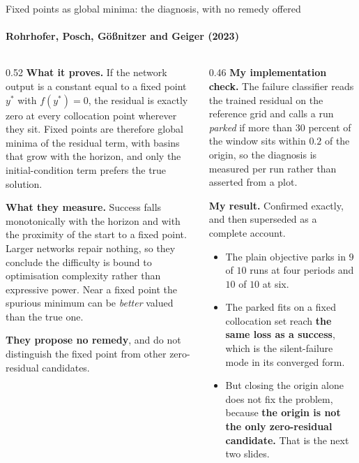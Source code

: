 \documentclass[aspectratio=169,10pt]{beamer}
\newcommand{\hl}[1]{{\color{accent}\textbf{#1}}}
\newcommand{\bad}[1]{{\color{warm}\textbf{#1}}}
\begin{document}
\begin{frame}[shrink=25]{Fixed points as global minima: the diagnosis, with no remedy offered}
  \framesubtitle{Rohrhofer, Posch, G\"o\ss{}nitzer and Geiger (2023)}
  \vspace{1mm}
  \begin{columns}[T]
    \begin{column}{0.52\textwidth}
      \textbf{What it proves.} If the network output is a constant equal to a
      fixed point $y^{\ast}$ with $f(y^{\ast}) = 0$, the residual is exactly zero
      at every collocation point wherever they sit. Fixed points are therefore
      global minima of the residual term, with basins that grow with the
      horizon, and only the initial-condition term prefers the true solution.
      \medskip

      \textbf{What they measure.} Success falls monotonically with the horizon
      and with the proximity of the start to a fixed point. Larger networks
      repair nothing, so they conclude the difficulty is bound to optimisation
      complexity rather than expressive power. Near a fixed point the spurious
      minimum can be \emph{better} valued than the true one.
      \medskip

      \textbf{They propose no remedy}, and do not distinguish the fixed point
      from other zero-residual candidates.
    \end{column}
    \begin{column}{0.46\textwidth}
      \textbf{My implementation check.} The failure classifier reads the trained
      residual on the reference grid and calls a run \emph{parked} if more than
      $30$ percent of the window sits within $0.2$ of the origin, so the
      diagnosis is measured per run rather than asserted from a plot.
      \medskip

      \textbf{My result.} Confirmed exactly, and then superseded as a complete
      account.
      \begin{itemize}\small
        \item The plain objective parks in $9$ of $10$ runs at four periods and
              $10$ of $10$ at six.
        \item The parked fits on a fixed collocation set reach \hl{the same loss
              as a success}, which is the silent-failure mode in its converged
              form.
        \item But closing the origin alone does not fix the problem, because
              \bad{the origin is not the only zero-residual candidate.} That is
              the next two slides.
      \end{itemize}
    \end{column}
  \end{columns}
\end{frame}
\end{document}
